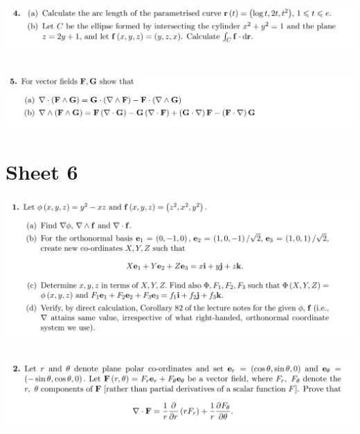 \subsection{}
\begin{mdframed}
  \includegraphics[width=400pt]{img/oxford-prelims-M5-multivariable-calc-5-4.png}
\end{mdframed}

\subsection{}
\begin{mdframed}
  \includegraphics[width=400pt]{img/oxford-prelims-M5-multivariable-calc-5-5.png}
\end{mdframed}


\newpage
\section{Sheet 6}
\begin{mdframed}
  \includegraphics[width=400pt]{img/oxford-prelims-M5-multivariable-calc-6-1.png}
\end{mdframed}

\subsection{}
\begin{mdframed}
  \includegraphics[width=400pt]{img/oxford-prelims-M5-multivariable-calc-6-2.png}
\end{mdframed}

